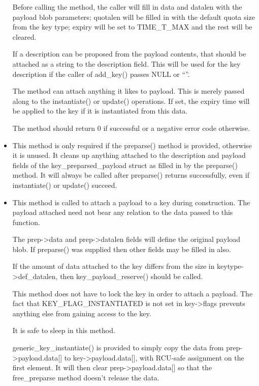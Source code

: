 \documentclass[a4paper,8pt,english]{sphinxmanual}
\begin{document}
\begin{itemize}
Before calling the method, the caller will fill in data and datalen with
the payload blob parameters; quotalen will be filled in with the default
quota size from the key type; expiry will be set to TIME\_T\_MAX and the
rest will be cleared.

If a description can be proposed from the payload contents, that should be
attached as a string to the description field.  This will be used for the
key description if the caller of add\_key() passes NULL or ``''.

The method can attach anything it likes to payload.  This is merely passed
along to the instantiate() or update() operations.  If set, the expiry
time will be applied to the key if it is instantiated from this data.

The method should return 0 if successful or a negative error code
otherwise.

\item {} 

This method is only required if the preparse() method is provided,
otherwise it is unused.  It cleans up anything attached to the description
and payload fields of the key\_preparsed\_payload struct as filled in by the
preparse() method.  It will always be called after preparse() returns
successfully, even if instantiate() or update() succeed.

\item {} 

This method is called to attach a payload to a key during construction.
The payload attached need not bear any relation to the data passed to this
function.

The prep-\textgreater{}data and prep-\textgreater{}datalen fields will define the original payload
blob.  If preparse() was supplied then other fields may be filled in also.

If the amount of data attached to the key differs from the size in
keytype-\textgreater{}def\_datalen, then key\_payload\_reserve() should be called.

This method does not have to lock the key in order to attach a payload.
The fact that KEY\_FLAG\_INSTANTIATED is not set in key-\textgreater{}flags prevents
anything else from gaining access to the key.

It is safe to sleep in this method.

generic\_key\_instantiate() is provided to simply copy the data from
prep-\textgreater{}payload.data{[}{]} to key-\textgreater{}payload.data{[}{]}, with RCU-safe assignment on
the first element.  It will then clear prep-\textgreater{}payload.data{[}{]} so that the
free\_preparse method doesn't release the data.


\end{itemize}
\end{document}
